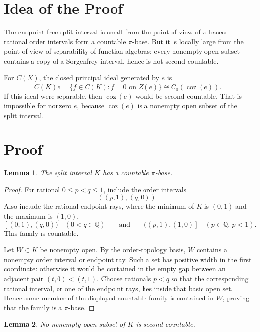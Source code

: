 \documentclass[11pt]{article}
\newtheorem{lemma}{Lemma}
\newcommand{\coz}{\operatorname{coz}}
\newcommand{\cl}{\overline}
\begin{document}
\section*{Idea of the Proof}

The endpoint-free split interval is small from the point of view of
\(\pi\)-bases: rational order intervals form a countable \(\pi\)-base.  But
it is locally large from the point of view of separability of function
algebras: every nonempty open subset contains a copy of a Sorgenfrey interval,
hence is not second countable.

For \(C(K)\), the closed principal ideal generated by \(e\) is
\[
        \cl{C(K)e}
        =
        \{f\in C(K):f=0 \text{ on } Z(e)\}
        \cong C_0(\coz(e)).
\]
If this ideal were separable, then \(\coz(e)\) would be second countable.
That is impossible for nonzero \(e\), because \(\coz(e)\) is a nonempty open
subset of the split interval.

\section*{Proof}

\begin{lemma}
\label{lem:pibase}
The split interval \(K\) has a countable \(\pi\)-base.
\end{lemma}

\begin{proof}
For rational \(0\le p<q\le1\), include the order intervals
\[
        ((p,1),(q,0)).
\]
Also include the rational endpoint rays, where the minimum of \(K\) is
\((0,1)\) and the maximum is \((1,0)\),
\[
        [(0,1),(q,0))\quad(0<q\in\mathbb Q)
        \qquad\text{and}\qquad
        ((p,1),(1,0)]\quad(p\in\mathbb Q,\ p<1).
\]
This family is countable.

Let \(W\subset K\) be nonempty open.  By the order-topology basis, \(W\)
contains a nonempty order interval or endpoint ray.  Such a set has positive
width in the first coordinate: otherwise it would be contained in the empty
gap between an adjacent pair \((t,0)<(t,1)\).  Choose rationals \(p<q\) so
that the corresponding rational interval, or one of the endpoint rays, lies
inside that basic open set.  Hence some member of the displayed countable
family is contained in \(W\), proving that the family is a \(\pi\)-base.
\end{proof}

\begin{lemma}
\label{lem:notsecond}
No nonempty open subset of \(K\) is second countable.
\end{lemma}
\end{document}
